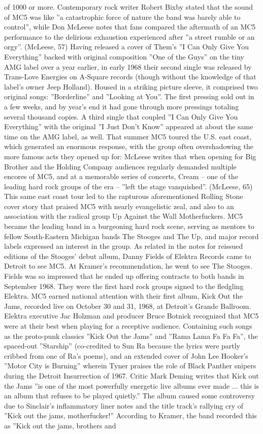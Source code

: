 \documentclass[11pt,a4paper, onecolumn]{article}
\begin{document}
of 1000 or more. Contemporary rock writer Robert Bixby stated that the sound of MC5 was like ''a catastrophic force of nature the band was barely able to control'', while Don McLeese notes that fans compared the aftermath of an MC5 performance to the delirious exhaustion experienced after ''a street rumble or an orgy''. (McLeese, 57) Having released a cover of Them's ''I Can Only Give You Everything'' backed with original composition ''One of the Guys'' on the tiny AMG label over a year earlier, in early 1968 their second single was released by Trans-Love Energies on A-Square records (though without the knowledge of that label's owner Jeep Holland). Housed in a striking picture sleeve, it comprised two original songs: ''Borderline'' and ''Looking at You''. The first pressing sold out in a few weeks, and by year's end it had gone through more pressings totaling several thousand copies. A third single that coupled ''I Can Only Give You Everything'' with the original ''I Just Don't Know'' appeared at about the same time on the AMG label, as well. That summer MC5 toured the U.S. east coast, which generated an enormous response, with the group often overshadowing the more famous acts they opened up for: McLeese writes that when opening for Big Brother and the Holding Company audiences regularly demanded multiple encores of MC5, and at a memorable series of concerts, Cream -- one of the leading hard rock groups of the era -- ''left the stage vanquished''. (McLeese, 65) This same east coast tour led to the rapturous aforementioned Rolling Stone cover story that praised MC5 with nearly evangelistic zeal, and also to an association with the radical group Up Against the Wall Motherfuckers. MC5 became the leading band in a burgeoning hard rock scene, serving as mentors to fellow South-Eastern Michigan bands The Stooges and The Up, and major record labels expressed an interest in the group. As related in the notes for reissued editions of the Stooges' debut album, Danny Fields of Elektra Records came to Detroit to see MC5. At Kramer's recommendation, he went to see The Stooges. Fields was so impressed that he ended up offering contracts to both bands in September 1968. They were the first hard rock groups signed to the fledgling Elektra. MC5 earned national attention with their first album, Kick Out the Jams, recorded live on October 30 and 31, 1968, at Detroit's Grande Ballroom. Elektra executive Jac Holzman and producer Bruce Botnick recognized that MC5 were at their best when playing for a receptive audience. Containing such songs as the proto-punk classics ''Kick Out the Jams'' and ''Rama Lama Fa Fa Fa'', the spaced-out ''Starship'' (co-credited to Sun Ra because the lyrics were partly cribbed from one of Ra's poems), and an extended cover of John Lee Hooker's ''Motor City is Burning'' wherein Tyner praises the role of Black Panther snipers during the Detroit Insurrection of 1967. Critic Mark Deming writes that Kick out the Jams ''is one of the most powerfully energetic live albums ever made ... this is an album that refuses to be played quietly.'' The album caused some controversy due to Sinclair's inflammatory liner notes and the title track's rallying cry of ''Kick out the jams, motherfucker!'' According to Kramer, the band recorded this as ''Kick out the jams, brothers and 
\end{document}
